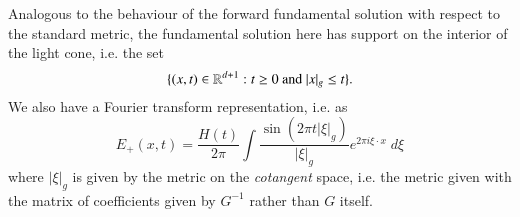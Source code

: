 %
%
%
%
%
%
%
%
%
Analogous to the behaviour of the forward fundamental solution with respect to the standard metric, the fundamental solution here has support on the interior of the light cone, i.e. the set
%
\[ \{ (x,t) \in \RR^{d+1}: t \geq 0\ \text{and}\ |x|_g \leq t \}. \]
%
We also have a Fourier transform representation, i.e. as
%
\[ E_+(x,t) = \frac{H(t)}{2 \pi} \int \frac{\sin(2 \pi t |\xi|_g)}{|\xi|_g} e^{2 \pi i \xi \cdot x}\; d\xi \]
%
where $|\xi|_g$ is given by the metric on the \emph{cotangent} space, i.e. the metric given with the matrix of coefficients given by $G^{-1}$ rather than $G$ itself.
%
%
%
%
%
